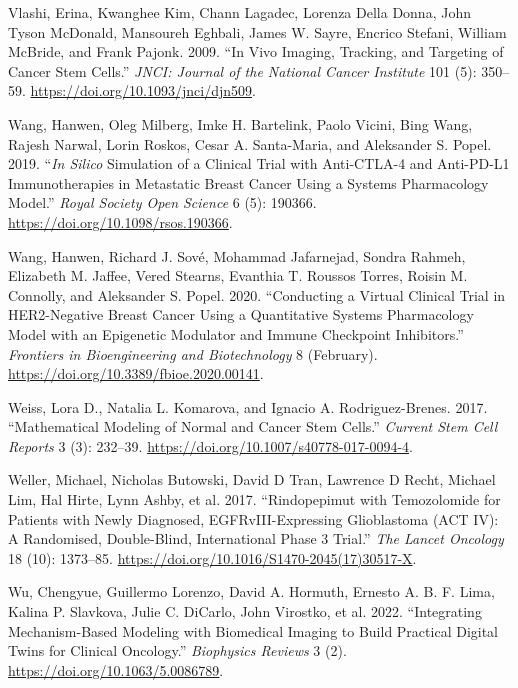 \documentclass[
  letterpaper,
]{scrreprt}
\newlength{\cslhangindent}
\newenvironment{CSLReferences}[2] %
 {\begin{list}{}{%
  \setlength{\itemindent}{0pt}
  \setlength{\leftmargin}{0pt}
  \setlength{\parsep}{0pt}
  \ifodd #1
   \setlength{\leftmargin}{\cslhangindent}
   \setlength{\itemindent}{-1\cslhangindent}
  \fi
  \setlength{\itemsep}{#2\baselineskip}}}
 {\end{list}}
\theoremstyle{definition}
\theoremstyle{remark}
\begin{document}
\begin{CSLReferences}{1}{0}
Vlashi, Erina, Kwanghee Kim, Chann Lagadec, Lorenza Della Donna, John
Tyson McDonald, Mansoureh Eghbali, James W. Sayre, Encrico Stefani,
William McBride, and Frank Pajonk. 2009. {``In Vivo Imaging, Tracking,
and Targeting of Cancer Stem Cells.''} \emph{JNCI: Journal of the
National Cancer Institute} 101 (5): 350--59.
\url{https://doi.org/10.1093/jnci/djn509}.

Wang, Hanwen, Oleg Milberg, Imke H. Bartelink, Paolo Vicini, Bing Wang,
Rajesh Narwal, Lorin Roskos, Cesar A. Santa-Maria, and Aleksander S.
Popel. 2019. {``{\emph{In Silico}} Simulation of a Clinical Trial with
Anti-CTLA-4 and Anti-PD-L1 Immunotherapies in Metastatic Breast Cancer
Using a Systems Pharmacology Model.''} \emph{Royal Society Open Science}
6 (5): 190366. \url{https://doi.org/10.1098/rsos.190366}.

Wang, Hanwen, Richard J. Sové, Mohammad Jafarnejad, Sondra Rahmeh,
Elizabeth M. Jaffee, Vered Stearns, Evanthia T. Roussos Torres, Roisin
M. Connolly, and Aleksander S. Popel. 2020. {``Conducting a Virtual
Clinical Trial in HER2-Negative Breast Cancer Using a Quantitative
Systems Pharmacology Model with an Epigenetic Modulator and Immune
Checkpoint Inhibitors.''} \emph{Frontiers in Bioengineering and
Biotechnology} 8 (February).
\url{https://doi.org/10.3389/fbioe.2020.00141}.

Weiss, Lora D., Natalia L. Komarova, and Ignacio A. Rodriguez-Brenes.
2017. {``Mathematical Modeling of Normal and Cancer Stem Cells.''}
\emph{Current Stem Cell Reports} 3 (3): 232--39.
\url{https://doi.org/10.1007/s40778-017-0094-4}.

Weller, Michael, Nicholas Butowski, David D Tran, Lawrence D Recht,
Michael Lim, Hal Hirte, Lynn Ashby, et al. 2017. {``Rindopepimut with
Temozolomide for Patients with Newly Diagnosed, EGFRvIII-Expressing
Glioblastoma (ACT IV): A Randomised, Double-Blind, International Phase 3
Trial.''} \emph{The Lancet Oncology} 18 (10): 1373--85.
\url{https://doi.org/10.1016/S1470-2045(17)30517-X}.

Wu, Chengyue, Guillermo Lorenzo, David A. Hormuth, Ernesto A. B. F.
Lima, Kalina P. Slavkova, Julie C. DiCarlo, John Virostko, et al. 2022.
{``Integrating Mechanism-Based Modeling with Biomedical Imaging to Build
Practical Digital Twins for Clinical Oncology.''} \emph{Biophysics
Reviews} 3 (2). \url{https://doi.org/10.1063/5.0086789}.


\end{CSLReferences}
\end{document}
